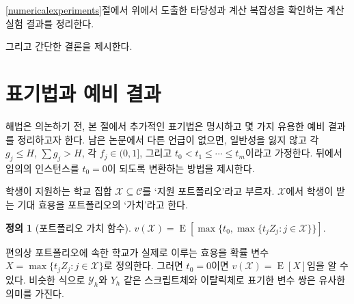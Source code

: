 \documentclass[11pt]{article} %
\newif\ifen
\theoremstyle{definition}
\newtheorem{definition}{Definition}
\theoremstyle{definition}
\newtheorem{definition}{정의}
\begin{document}
\ifen
In Section \ref{numericalexperiments}, we present the results of computational experiments that confirm the validity and time complexity results established in the previous two sections. %

A brief conclusion follows.
\else
\ref{numericalexperiments}절에서 위에서 도출한 타당성과 계산 복잡성을 확인하는 계산 실험 결과를 정리한다. 

그리고 간단한 결론을 제시한다.
\fi



\ifen \section{Notation and preliminary results} \else \section{표기법과 예비 결과}\fi\label{preliminaries}
\ifen Before discussing the solution algorithms, we will introduce additional notation and a few preliminary results. For the remainder of the paper, unless otherwise noted, we assume with trivial loss of generality that each $g_j \leq H$, $\sum g_j > H$, each $f_j \in (0, 1]$, and $t_0 < t_1 \leq \cdots \leq t_m$. %
\else
해법은 의논하기 전, 본 절에서 추가적인 표기법은 명시하고 몇 가지 유용한 예비 결과를 정리하고자 한다. 남은 논문에서 다른 언급이 없으면, 일반성을 잃지 않고 각 $g_j \leq H$, $\sum g_j > H$, 각 $f_j \in (0, 1]$, 그리고 $t_0 < t_1 \leq \cdots \leq t_m$이라고 가정한다. 뒤에서 임의의 인스턴스를 $t_0 = 0$이 되도록 변환하는 방법을 제시한다. %
\fi

\ifen
We refer to the set $\mathcal{X} \subseteq \mathcal{C}$ of schools to which a student applies as her \emph{application portfolio.} The expected utility the student receives from $\mathcal{X}$ is called its \emph{valuation}. %
\else
학생이 지원하는 학교 집합 $\mathcal{X} \subseteq \mathcal{C}$를 `지원 포트폴리오'라고 부르자. $\mathcal{X}$에서 학생이 받는 기대 효용을 포트폴리오의 `가치'라고 한다.
\fi 
\begin{definition}[\ifen Portfolio valuation function\else 포트폴리오 가치 함수\fi]
$v(\mathcal{X}) =  \operatorname{E}\left[\max\bigr\{t_0,
\max\{t_j Z_j : j \in \mathcal{X}\}\bigr\}\right]$.
\end{definition}
\ifen
\noindent It is helpful to define the random variable $X  = \max\{ t_j Z_j : j \in \mathcal{X}\}$ as the utility achieved by the schools in the portfolio, so that when $t_0 = 0$, $v(\mathcal{X}) = \operatorname{E}[X]$. Similar pairs of variables with script and italic names such as $\mathcal{Y}_h$ and $Y_h$ will carry an analogous meaning.
\else
\noindent 편의상 포트폴리오에 속한 학교가 실제로 이루는 효용을 확률 변수 $X  = \max\{ t_j Z_j : j \in \mathcal{X}\}$로 정의한다. 그러면 $t_0 = 0$이면 $v(\mathcal{X}) = \operatorname{E}[X]$임을 알 수 있다. 비슷한 식으로 $\mathcal{Y}_h$와 $Y_h$ 같은 스크립트체와 이탈릭체로 표기한 변수 쌍은 유사한 의미를 가진다.
\fi
\end{document}
